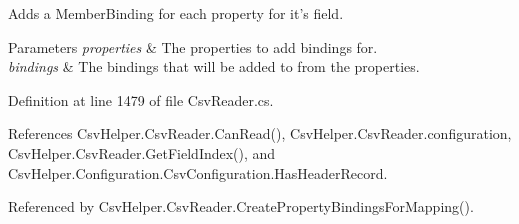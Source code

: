 Adds a Member\-Binding for each property for it's field. 


\begin{DoxyParams}{Parameters}
{\em properties} & The properties to add bindings for.\\
\hline
{\em bindings} & The bindings that will be added to from the properties.\\
\hline
\end{DoxyParams}


Definition at line 1479 of file Csv\-Reader.\-cs.



References Csv\-Helper.\-Csv\-Reader.\-Can\-Read(), Csv\-Helper.\-Csv\-Reader.\-configuration, Csv\-Helper.\-Csv\-Reader.\-Get\-Field\-Index(), and Csv\-Helper.\-Configuration.\-Csv\-Configuration.\-Has\-Header\-Record.



Referenced by Csv\-Helper.\-Csv\-Reader.\-Create\-Property\-Bindings\-For\-Mapping().


